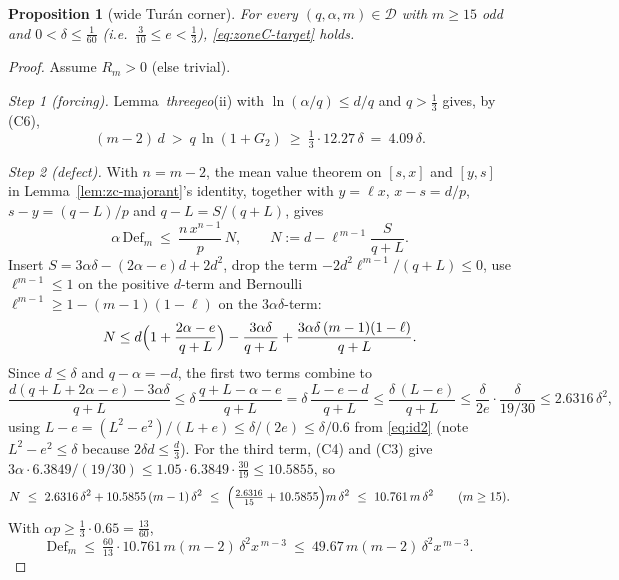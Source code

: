 \documentclass[11pt]{article}
\newtheorem{proposition}[theorem]{Proposition}
\theoremstyle{remark}
\theoremstyle{plain}
\theoremstyle{plain}
\newcommand{\D}{\mathcal D}
\begin{document}
\begin{proposition}[wide Tur\'an corner]\label{prop:wide}
For every $(q,\alpha,m)\in\D$ with $m\ge15$ odd and
$0<\delta\le\tfrac1{60}$ (i.e.\ $\tfrac3{10}\le e<\tfrac13$),
\eqref{eq:zoneC-target} holds.
\end{proposition}

\begin{proof}
Assume $R_m>0$ (else trivial).

\emph{Step 1 (forcing).}  Lemma~\emph{threegeo}(ii) with
$\ln(\alpha/q)\le d/q$ and $q>\tfrac13$ gives, by (C6),
\begin{equation}\label{eq:wide-forcing}
 (m-2)\,d\ >\ q\,\ln(1+G_2)\ \ge\ \tfrac13\cdot12.27\,\delta\ =\ 4.09\,\delta .
\end{equation}

\emph{Step 2 (defect).}  With $n=m-2$, the mean value theorem on
$[s,x]$ and $[y,s]$ in Lemma~\ref{lem:zc-majorant}'s identity, together with
$y=\ell x$, $x-s=d/p$, $s-y=(q-L)/p$ and $q-L=S/(q+L)$, gives
\[
 \alpha\,\mathrm{Def}_m\ \le\ \frac{n\,x^{n-1}}p\,N,
 \qquad
 N:=d-\ell^{\,m-1}\frac S{q+L}.
\]
Insert $S=3\alpha\delta-(2\alpha-e)d+2d^2$, drop the term
$-2d^2\ell^{m-1}/(q+L)\le0$, use $\ell^{m-1}\le1$ on the positive $d$-term
and Bernoulli $\ell^{m-1}\ge1-(m-1)(1-\ell)$ on the $3\alpha\delta$-term:
\[
 N\le d\Bigl(1+\frac{2\alpha-e}{q+L}\Bigr)-\frac{3\alpha\delta}{q+L}
 +\frac{3\alpha\delta\,(m-1)(1-\ell)}{q+L}.
\]
Since $d\le\delta$ and $q-\alpha=-d$, the first two terms combine to
\[
 \frac{d(q+L+2\alpha-e)-3\alpha\delta}{q+L}
 \le\delta\,\frac{q+L-\alpha-e}{q+L}
 =\delta\,\frac{L-e-d}{q+L}
 \le\frac{\delta\,(L-e)}{q+L}
 \le\frac{\delta}{2e}\cdot\frac{\delta}{19/30}
 \le2.6316\,\delta^2,
\]
using $L-e=(L^2-e^2)/(L+e)\le\delta/(2e)\le\delta/0.6$ from \eqref{eq:id2}
(note $L^2-e^2\le\delta$ because $2\delta d\le\tfrac d3$).  For the third
term, (C4) and (C3) give
$3\alpha\cdot6.3849/(19/30)\le1.05\cdot6.3849\cdot\tfrac{30}{19}
\le10.5855$, so
\[
 N\ \le\ 2.6316\,\delta^2+10.5855\,(m-1)\,\delta^2
 \ \le\ \Bigl(\tfrac{2.6316}{15}+10.5855\Bigr)m\,\delta^2
 \ \le\ 10.761\,m\,\delta^2 \qquad(m\ge15).
\]
With $\alpha p\ge\tfrac13\cdot0.65=\tfrac{13}{60}$,
\begin{equation}\label{eq:wide-defect}
 \mathrm{Def}_m\ \le\ \tfrac{60}{13}\cdot10.761\,m(m-2)\,\delta^2x^{\,m-3}
 \ \le\ 49.67\,m(m-2)\,\delta^2x^{\,m-3}.
\end{equation}


\end{proof}
\end{document}
